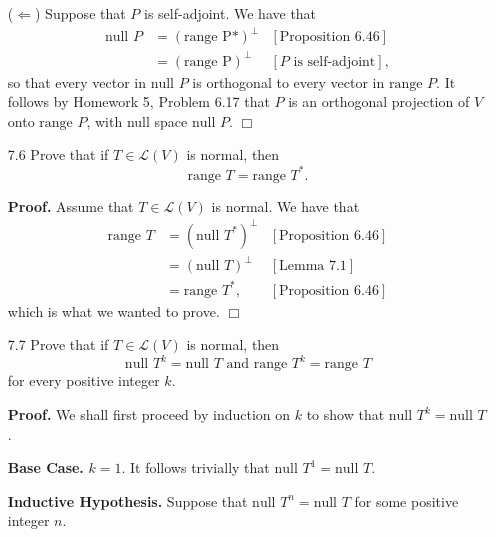 \documentclass[9pt]{article}
\newcommand{\qed}{\hfill \ensuremath{\Box}}
\begin{document}
\begin{enumerate}
      ($\Longleftarrow$) Suppose that $P$ is self-adjoint. We have that
      \begin{align*}
         \text{null }P &= (\text{range P*})^\perp &[\text{Proposition }6.46] \\
            &= (\text{range P})^\perp &[P \text{ is self-adjoint}],
      \end{align*}
      so that every vector in $\text{null }P$ is orthogonal to every vector in
      $\text{range }P$. It follows by Homework 5, Problem 6.17 that $P$ is an
      orthogonal projection of $V$ onto $\text{range }P$, with null space
      $\text{null }P$. \qed
   \item[7.6]  Prove that if $T \in \mathcal{L}(V)$ is normal, then
               $$\text{range } T = \text{range } T^*.$$

      \textbf{Proof.} Assume that $T \in \mathcal{L}(V)$ is normal. We have that
      \begin{align*}
         \text{range } T &= (\text{null } T^*)^\perp
            &[\text{Proposition }6.46] \\
            &= (\text{null } T)^\perp  &[\text{Lemma }7.1] \\
            &= \text{range } T^*, &[\text{Proposition }6.46]
      \end{align*}
      which is what we wanted to prove. \qed
   \item[7.7]  Prove that if $T \in \mathcal{L}(V)$ is normal, then
               $$
                  \text{null } T^k = \text{null } T \text{ and }
                  \text{range }T^k = \text{range }T$$
               for every positive integer $k$.

      \textbf{Proof.} We shall first proceed by induction on $k$ to show that
      $\text{null } T^k = \text{null } T$.

      \textbf{Base Case.} $k = 1$. It follows trivially that
      $\text{null } T^1 = \text{null } T$.

      \textbf{Inductive Hypothesis.} Suppose that
      $\text{null } T^n = \text{null }T$ for some positive integer $n$. \\


\end{enumerate}
\end{document}
